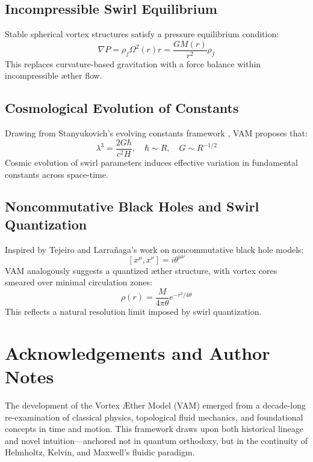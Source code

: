 \documentclass[preprint]{revtex4-2}
\begin{document}
            \subsection*{Incompressible Swirl Equilibrium}
            Stable spherical vortex structures satisfy a pressure equilibrium condition:
            \[
                \nabla P = \rho_{\scriptscriptstyle\boldsymbol\!f} \Omega^2(r) r = \frac{G M(r)}{r^2} \rho_{\scriptscriptstyle\boldsymbol\!f}
            \]
            This replaces curvature-based gravitation with a force balance within incompressible æther flow.

            \subsection*{Cosmological Evolution of Constants}
            Drawing from Stanyukovich’s evolving constants framework \cite{stanyukovich2008evolution}, VAM proposes that:
            \[
                \lambda^3 = \frac{2G\hbar}{c^2 H}, \quad \hbar \sim R, \quad G \sim R^{-1/2}
            \]
            Cosmic evolution of swirl parameters induces effective variation in fundamental constants across space-time.

            \subsection*{Noncommutative Black Holes and Swirl Quantization}
            Inspired by Tejeiro and Larrañaga’s work \cite{tejeiro2011noncomm} on noncommutative black hole models:
            \[
                [x^\mu, x^\nu] = i \theta^{\mu\nu}
            \]
            VAM analogously suggests a quantized æther structure, with vortex cores smeared over minimal circulation zones:
            \[
                \rho(r) = \frac{M}{4\pi \theta} e^{-r^2/4\theta}
            \]
            This reflects a natural resolution limit imposed by swirl quantization.


        \section{Acknowledgements and Author Notes}
            The development of the Vortex \AE{}ther Model (VAM) emerged from a decade-long re-examination of classical physics, topological fluid mechanics, and foundational concepts in time and motion. This framework draws upon both historical lineage and novel intuition—anchored not in quantum orthodoxy, but in the continuity of Helmholtz, Kelvin, and Maxwell's fluidic paradigm.
        
\end{document}
